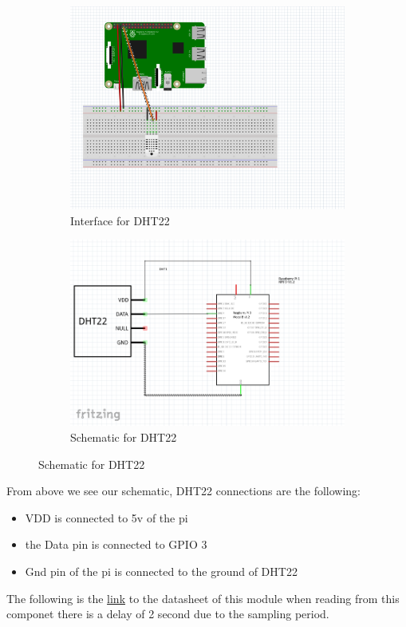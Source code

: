 \begin{figure}[h!]
	\centering
	\begin{subfigure}{0.6\textwidth}
		\includegraphics[width=\textwidth]{Images/InterfaceforDHT22.png}
		\caption{Interface for DHT22}
		\label{Interface for DHT22}
	\end{subfigure}
	\hfill
	\begin{subfigure}{0.6\textwidth}
		\includegraphics[width=\textwidth]{Images/schematicforDHT22.png}
		\caption{Schematic for DHT22}
		\label{Sychematic for DHT22 revised}
	\end{subfigure}
\end{figure}
From above we see our schematic, DHT22 connections are the following:
\begin{itemize}
	\item VDD is connected to 5v of the pi
	\item the Data pin is connected to GPIO 3
	\item Gnd pin  of the  pi is  connected to the ground  of DHT22 

\end{itemize}
\cite{sparkfun} The following is the \href{https://www.sparkfun.com/datasheets/Sensors/Temperature/DHT22.pdf}{link} to the datasheet of this module
when reading from this  componet there is  a  delay  of 2 second due to the  sampling period.

